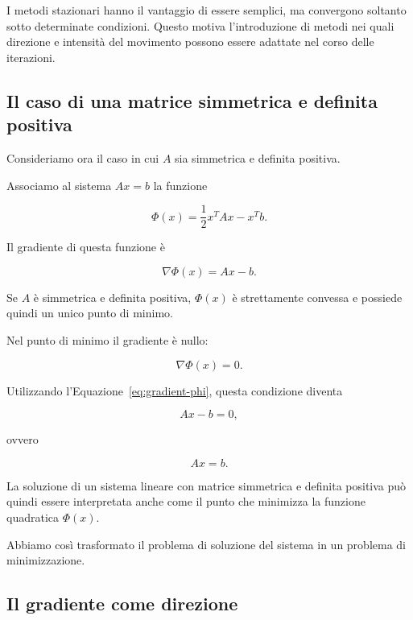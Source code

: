 I metodi stazionari hanno il vantaggio di essere semplici, ma
convergono soltanto sotto determinate condizioni. Questo motiva
l'introduzione di metodi nei quali direzione e intensità del
movimento possono essere adattate nel corso delle iterazioni.


\subsection{Il caso di una matrice simmetrica e definita positiva}

Consideriamo ora il caso in cui $A$ sia simmetrica e definita
positiva.

Associamo al sistema $Ax=b$ la funzione

\begin{equation*}
    \Phi(x)
    =
    \frac{1}{2}x^TAx-x^Tb.
    \label{eq:phi-gradient}
\end{equation*}

Il gradiente di questa funzione è

\begin{equation}
    \nabla\Phi(x)=Ax-b.
    \label{eq:gradient-phi}
\end{equation}

Se $A$ è simmetrica e definita positiva, $\Phi(x)$ è strettamente
convessa e possiede quindi un unico punto di minimo.

Nel punto di minimo il gradiente è nullo:

\begin{equation*}
    \nabla\Phi(x)=0.
\end{equation*}

Utilizzando l'Equazione~\eqref{eq:gradient-phi}, questa condizione
diventa

\begin{equation*}
    Ax-b=0,
\end{equation*}

ovvero

\begin{equation*}
    Ax=b.
\end{equation*}

La soluzione di un sistema lineare con matrice simmetrica e
definita positiva può quindi essere interpretata anche come il
punto che minimizza la funzione quadratica $\Phi(x)$.

Abbiamo così trasformato il problema di soluzione del sistema in
un problema di minimizzazione.


\subsection{Il gradiente come direzione}

